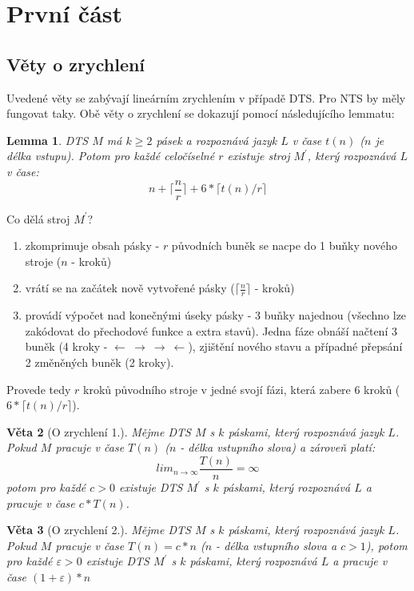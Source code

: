 \documentclass[a4paper]{article}      %
\newtheorem{theorem}{Věta}[section]
\newtheorem{lemma}[theorem]{Lemma}
\newenvironment{proof}[1][Důkaz]{\begin{trivlist}
\item[\hskip \labelsep {\bfseries #1}]}{\end{trivlist}}
\begin{document}
\section{První část}

\subsection{Věty o zrychlení}
Uvedené věty se zabývají lineárním zrychlením v případě DTS. Pro NTS by měly fungovat taky.
Obě věty o zrychlení se dokazují pomocí následujícího lemmatu:
\begin{lemma}
DTS $M$ má $k \geq 2$ pásek a rozpoznává jazyk $L$ v čase $t(n)$ ($n$ je délka vstupu).
Potom pro každé celočíselné $r$ existuje stroj $M^{'}$, který rozpoznává $L$ v čase:
\[
n+\lceil\frac{n}{r}\rceil+6*\lceil t(n)/r \rceil
\]
\end{lemma}

\begin{proof}
Co dělá stroj $M^{'}$?
\begin{enumerate}
\item zkomprimuje obsah pásky - $r$ původních buněk se nacpe do 1 buňky nového stroje ($n$ - kroků)
\item vrátí se na začátek nově vytvořené pásky ($\lceil\frac{n}{r}\rceil$ - kroků)
\item provádí výpočet nad konečnými úseky pásky - 3 buňky najednou (všechno lze zakódovat do přechodové funkce a extra stavů).
Jedna fáze obnáší načtení 3 buněk (4 kroky - $\leftarrow\ \rightarrow\ \rightarrow\ \leftarrow$), zjištění nového stavu a případné přepsání 2 změněných buněk (2 kroky).
\end{enumerate}
Provede tedy $r$ kroků původního stroje v jedné svojí fázi, která zabere 6 kroků ($6*\lceil t(n)/r \rceil$).
\end{proof}

\begin{theorem}[O zrychlení 1.]
Mějme DTS $M$ s $k$ páskami, který rozpoznává jazyk $L$.
Pokud $M$ pracuje v čase $T(n)$ ($n$ - délka vstupního slova) a zároveň platí:
\[
lim_{n\rightarrow \infty} \frac{T(n)}{n} = \infty
\]
potom pro každé $c>0$ existuje DTS $M^{'}$ s $k$ páskami, který rozpoznává $L$ a pracuje v čase $c*T(n)$.
\end{theorem}

\begin{theorem}[O zrychlení 2.]
Mějme DTS $M$ s $k$ páskami, který rozpoznává jazyk $L$.
Pokud $M$ pracuje v čase $T(n)=c*n$ ($n$ - délka vstupního slova a $c>1$), potom pro každé $\varepsilon > 0$
existuje DTS $M^{'}$ s $k$ páskami, který rozpoznává $L$ a pracuje v čase $(1+\varepsilon)*n$
\end{theorem}
\end{document}
